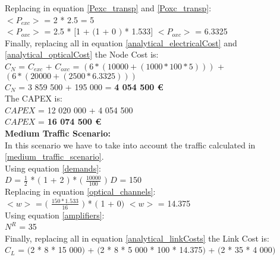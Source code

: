 Replacing in equation \ref{Pexc_transp} and \ref{Poxc_transp}:\\

$<P_{exc}>$ = 2 * 2.5 = 5\\

$<P_{oxc}>$ = 2.5 * $[$1 + $($1 + $0$ $)$ * 1.533$]$ \qquad \quad $<P_{oxc}>$ = 6.3325 \\

Finally, replacing all in equation \ref{analytical_electricalCost} and \ref{analytical_opticalCost} the Node Cost is:\\

$C_N$ = $C_{exc}$ + $C_{oxc}$ = $\left( 6*(10 000 + (1 000 * 100 * 5 ) ) \right)$ + $\left(6*(20 000 + (2 500 * 6.3325 ) ) \right)$\\

$C_N$ = 3 859 500 + 195 000 = \textbf{4 054 500 \euro}\\

The CAPEX is:\\
$CAPEX$ = 12 020 000 + 4 054 500\\

$CAPEX$ = \textbf{16 074 500 \euro}\\


\textbf{Medium Traffic Scenario:}\\
In this scenario we have to take into account the traffic calculated in \ref{medium_traffic_scenario}.\\

Using equation \ref{demands}:\\

$D$ = $\frac{1}{2}$ * $($ 1 + 2 $)$ * $($ $\frac{10000}{100}$ $)$ \qquad \qquad $D$ = 150\\

Replacing in equation \ref{optical_channels}:\\

$<w>$ = $($ $\frac{150 * 1.533}{16}$ $)$ * $($ 1 + 0$)$ \qquad \qquad $<w>$ = 14.375\\

Using equation \ref{amplifiers}:\\

$N^R$ = 35\\

Finally, replacing all in equation \ref{analytical_linkCosts} the Link Cost is:\\

$C_L$ = $($2 * 8 * 15 000$)$ + $($2 * 8 * 5 000 * 100 * 14.375$)$ + $($2 * 35 * 4 000$)$\\

